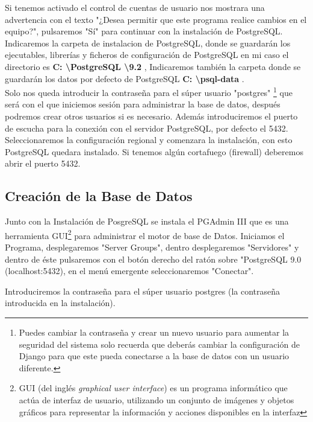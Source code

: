 Si tenemos activado el control de cuentas de usuario nos mostrara una advertencia con el texto "¿Desea permitir que este programa realice cambios en el equipo?", pulsaremos "Sí" para continuar con la instalación de PostgreSQL.\\[0.2cm]

Indicaremos la carpeta de instalacion de PostgreSQL, donde se guardarán los ejecutables, librerías y ficheros de configuración de PostgreSQL en mi caso el directorio es {\bfseries C: \textbackslash PostgreSQL \textbackslash 9.2 }, Indicaremos también la carpeta donde se guardarán los datos por defecto de PostgreSQL {\bfseries C: \textbackslash psql-data }.\\[0.2cm]

Solo nos queda introducir la contraseña para el súper usuario "postgres" \footnote{Puedes cambiar la contraseña y crear un nuevo usuario para aumentar la seguridad del sistema solo recuerda que deberás cambiar la configuración de Django para que este pueda conectarse a la base de datos con un usuario diferente.} que será con el que iniciemos sesión para administrar la base de datos, después podremos crear otros usuarios si es necesario. Además introduciremos el puerto de escucha para la conexión con el servidor PostgreSQL, por defecto el 5432.\\[0.2cm]

Seleccionaremos la configuración regional y comenzara la instalación, con esto PostgreSQL quedara instalado. Si tenemos algún cortafuego (firewall) deberemos abrir el puerto 5432.

\subsection{Creación de la Base de Datos}

Junto con la Instalación de PosgreSQL se instala el PGAdmin III que es una herramienta GUI\footnote{GUI (del inglés \textit{graphical user interface}) es un programa informático que actúa de interfaz de usuario, utilizando un conjunto de imágenes y objetos gráficos para representar la información y acciones disponibles en la interfaz} para administrar el motor de base de Datos. Iniciamos el Programa, desplegaremos "Server Groups", dentro desplegaremos "Servidores" y dentro de éste pulsaremos con el botón derecho del ratón sobre "PostgreSQL 9.0 (localhost:5432), en el menú emergente seleccionaremos "Conectar".

Introduciremos la contraseña para el súper usuario postgres (la contraseña introducida en la instalación).

